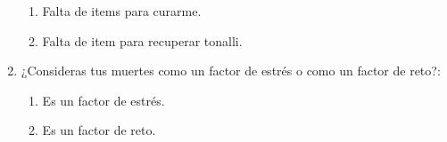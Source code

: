\begin{enumerate}
\begin{enumerate}
            \item Falta de items para curarme.
            \item Falta de item para recuperar tonalli.
        \end{enumerate}
    \item ¿Consideras tus muertes como un factor de estrés o como un factor de reto?:
        \begin{enumerate}
            \item Es un factor de estrés.
            \item Es un factor de reto.
        \end{enumerate}
\end{enumerate}